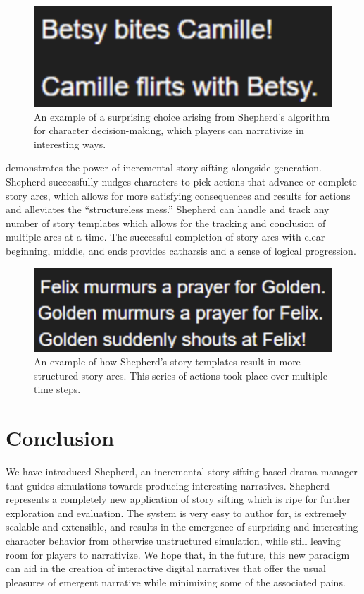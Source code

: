 \documentclass[letterpaper]{article}
\begin{document}
\begin{figure}[h]
    \centering
    \includegraphics[width=\columnwidth]{figure-bc_bite_flirt}
    \caption{An example of a surprising choice arising from Shepherd's algorithm for
    character decision-making, which players can narrativize in interesting ways.}
    \label{fig:bite}
\end{figure}

 demonstrates the power of incremental story sifting
alongside generation. Shepherd successfully nudges characters to pick actions that advance
or complete story arcs, which allows for more satisfying consequences and results for
actions and alleviates the “structureless mess.” Shepherd can handle and track any number
of story templates which allows for the tracking and conclusion of multiple arcs at a
time. The successful completion of story arcs with clear beginning, middle, and ends
provides catharsis and a sense of logical progression. 

\begin{figure}[h]
    \centering
    \includegraphics[width=\columnwidth]{figure-fg_pray_shout}
    \caption{An example of how Shepherd's story templates result in more structured story
    arcs. This series of actions took place over multiple time steps.}
    \label{fig:pray}
\end{figure}

\section{Conclusion}
We have introduced Shepherd, an incremental story sifting-based drama manager that guides
simulations towards producing interesting narratives. Shepherd represents a completely new
application of story sifting which is ripe for further exploration and evaluation. The
system is very easy to author for, is extremely scalable and extensible, and results in
the emergence of surprising and interesting character behavior from otherwise unstructured
simulation, while still leaving room for players to narrativize. We hope that, in the
future, this new paradigm can aid in the creation of interactive digital narratives that
offer the usual pleasures of emergent narrative while minimizing some of the associated
pains.
\end{document}
